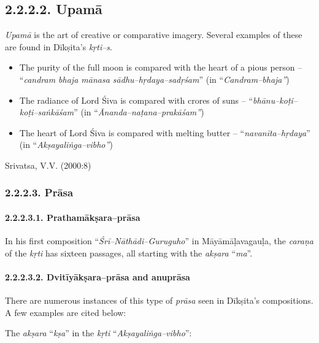 \subsection*{2.2.2.2. Upamā}

\textit{Upamā} is the art of creative or comparative imagery. Several examples of these are found in Dīkṣita’s \textit{kṛti–s}.

\begin{itemize}
\itemsep=0pt
\item The purity of the full moon is compared with the heart of a pious person – “\textit{candram bhaja mānasa sādhu–hṛdaya–sadṛśam}” (in “\textit{Candram–bhaja”})

 \item The radiance of Lord Śiva is compared with crores of suns – “\textit{bhānu–koṭi–koṭi–saṅkāśam}” (in “\textit{Ānanda–naṭana–prakāśam”})

 \item The heart of Lord Śiva is compared with melting butter – “\textit{navanīta–hṛdaya}” (in “\textit{Akṣayaliṅga–vibho”})

\end{itemize}

\begin{flushright}
Srivatsa, V.V. (2000:8)
\end{flushright}


\subsubsection*{2.2.2.3. Prāsa}

\paragraph*{2.2.2.3.1. Prathamākṣara–prāsa}

In his first composition “\textit{Śrī–Nāthādi–Guruguho}” in Māyāmāḷavagauḷa, the \textit{caraṇa} of the \textit{kṛti} has sixteen passages, all starting with the \textit{akṣara} “\textit{ma}”.


\paragraph*{2.2.2.3.2. Dvitīyākṣara–prāsa and anuprāsa}

There are numerous instances of this type of \textit{prāsa} seen in Dīkṣita’s compositions. A few examples are cited below:

The \textit{akṣara} “\textit{kṣa}” in the \textit{kṛti} “\textit{Akṣayaliṅga–vibho}”:

